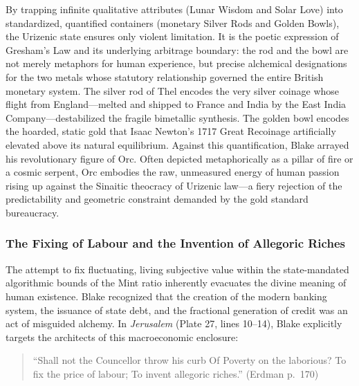 \documentclass[
]{article}
\begin{document}
By trapping infinite qualitative attributes (Lunar Wisdom and Solar
Love) into standardized, quantified containers (monetary Silver Rods and
Golden Bowls), the Urizenic state ensures only violent limitation. It is
the poetic expression of Gresham's Law and its underlying arbitrage
boundary: the rod and the bowl are not merely metaphors for human
experience, but precise alchemical designations for the two metals whose
statutory relationship governed the entire British monetary system. The
silver rod of Thel encodes the very silver coinage whose flight from
England---melted and shipped to France and India by the East India
Company---destabilized the fragile bimetallic synthesis. The golden bowl
encodes the hoarded, static gold that Isaac Newton's 1717 Great
Recoinage artificially elevated above its natural equilibrium. Against
this quantification, Blake arrayed his revolutionary figure of Orc.
Often depicted metaphorically as a pillar of fire or a cosmic serpent,
Orc embodies the raw, unmeasured energy of human passion rising up
against the Sinaitic theocracy of Urizenic law---a fiery rejection of
the predictability and geometric constraint demanded by the gold
standard bureaucracy.

\subsubsection{The Fixing of Labour and the Invention of Allegoric
Riches}\label{the-fixing-of-labour-and-the-invention-of-allegoric-riches}

The attempt to fix fluctuating, living subjective value within the
state-mandated algorithmic bounds of the Mint ratio inherently evacuates
the divine meaning of human existence. Blake recognized that the
creation of the modern banking system, the issuance of state debt, and
the fractional generation of credit was an act of misguided alchemy. In
\emph{Jerusalem} (Plate 27, lines 10--14), Blake explicitly targets the
architects of this macroeconomic enclosure:

\begin{quote}
``Shall not the Councellor throw his curb Of Poverty on the laborious?
To fix the price of labour; To invent allegoric riches.'' (Erdman
p.~170) \citep{erdman1988complete, sklar2011blake}
\end{quote}
\end{document}
